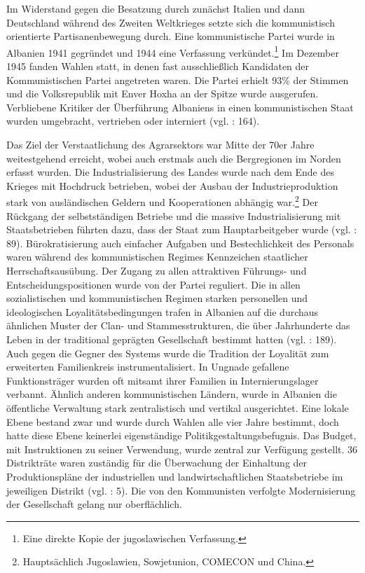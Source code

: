 Im Widerstand gegen die Besatzung durch zunächst Italien und dann Deutschland während des Zweiten Weltkrieges setzte sich die kommunistisch orientierte Partisanenbewegung durch. Eine kommunistische Partei wurde in Albanien 1941 gegründet und 1944 eine Verfassung verkündet.\footnote{Eine direkte Kopie der jugoslawischen Verfassung.} Im Dezember 1945 fanden Wahlen statt, in denen fast ausschließlich Kandidaten der Kommunistischen Partei angetreten waren. Die Partei erhielt 93\% der Stimmen und die Volksrepublik mit Enver Hoxha an der Spitze wurde ausgerufen. Verbliebene Kritiker der Überführung Albaniens in einen kommunistischen Staat wurden umgebracht, vertrieben oder interniert (vgl. \cite{vickers} : 164).\par
Das Ziel der Verstaatlichung des Agrarsektors war Mitte der 70er Jahre weitestgehend erreicht, wobei auch erstmals auch die Bergregionen im Norden erfasst wurden. Die Industrialisierung des Landes wurde nach dem Ende des Krieges mit Hochdruck betrieben, wobei der Ausbau der Industrieproduktion stark von ausländischen Geldern und Kooperationen abhängig war.\footnote{Hauptsächlich Jugoslawien, Sowjetunion, COMECON und China.} Der Rückgang der selbstständigen Betriebe und die massive Industrialisierung mit Staatsbetrieben führten dazu, dass der Staat zum Hauptarbeitgeber wurde (vgl. \cite{hens99} : 89). Bürokratisierung auch einfacher Aufgaben und Bestechlichkeit des Personals waren während des kommunistischen Regimes Kennzeichen staatlicher Herrschaftsausübung. Der Zugang zu allen attraktiven Führungs- und Entscheidungspositionen wurde von der Partei reguliert. Die in allen sozialistischen und kommunistischen Regimen starken personellen und ideologischen Loyalitätsbedingungen trafen in Albanien auf die durchaus ähnlichen Muster der Clan- und Stammesstrukturen, die über Jahrhunderte das Leben in der traditional geprägten Gesellschaft bestimmt hatten (vgl. \cite{vickers} : 189). Auch gegen die Gegner des Systems wurde die Tradition der Loyalität zum erweiterten Familienkreis instrumentalisiert. In Ungnade gefallene Funktionsträger wurden oft mitsamt ihrer Familien in Internierungslager verbannt. Ähnlich anderen kommunistischen Ländern, wurde in Albanien die öffentliche Verwaltung stark zentralistisch und vertikal ausgerichtet. Eine lokale Ebene bestand zwar und wurde durch Wahlen alle vier Jahre bestimmt, doch hatte diese Ebene keinerlei eigenständige Politikgestaltungsbefugnis. Das Budget, mit Instruktionen zu seiner Verwendung, wurde zentral zur Verfügung gestellt. 36 Distrikträte waren zuständig für die Überwachung der Einhaltung der Produktionspläne der industriellen und landwirtschaftlichen Staatsbetriebe im jeweiligen Distrikt (vgl. \cite{hoxha} : 5). Die von den Kommunisten verfolgte Modernisierung der Gesellschaft gelang nur oberflächlich.

